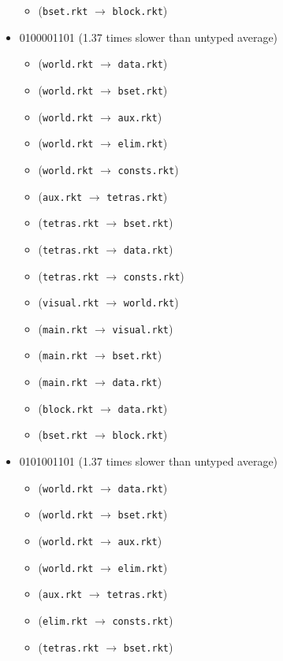 \documentclass{article}
\newcommand{\mono}[1]{\texttt{#1}}
\begin{document}
\begin{itemize}
\begin{itemize}
  \item (\mono{bset.rkt} $\rightarrow$ \mono{block.rkt})
  \end{itemize}
\item 0100001101 (1.37 times slower than untyped average)
  \begin{itemize}
  \item (\mono{world.rkt} $\rightarrow$ \mono{data.rkt})
  \item (\mono{world.rkt} $\rightarrow$ \mono{bset.rkt})
  \item (\mono{world.rkt} $\rightarrow$ \mono{aux.rkt})
  \item (\mono{world.rkt} $\rightarrow$ \mono{elim.rkt})
  \item (\mono{world.rkt} $\rightarrow$ \mono{consts.rkt})
  \item (\mono{aux.rkt} $\rightarrow$ \mono{tetras.rkt})
  \item (\mono{tetras.rkt} $\rightarrow$ \mono{bset.rkt})
  \item (\mono{tetras.rkt} $\rightarrow$ \mono{data.rkt})
  \item (\mono{tetras.rkt} $\rightarrow$ \mono{consts.rkt})
  \item (\mono{visual.rkt} $\rightarrow$ \mono{world.rkt})
  \item (\mono{main.rkt} $\rightarrow$ \mono{visual.rkt})
  \item (\mono{main.rkt} $\rightarrow$ \mono{bset.rkt})
  \item (\mono{main.rkt} $\rightarrow$ \mono{data.rkt})
  \item (\mono{block.rkt} $\rightarrow$ \mono{data.rkt})
  \item (\mono{bset.rkt} $\rightarrow$ \mono{block.rkt})
  \end{itemize}
\item 0101001101 (1.37 times slower than untyped average)
  \begin{itemize}
  \item (\mono{world.rkt} $\rightarrow$ \mono{data.rkt})
  \item (\mono{world.rkt} $\rightarrow$ \mono{bset.rkt})
  \item (\mono{world.rkt} $\rightarrow$ \mono{aux.rkt})
  \item (\mono{world.rkt} $\rightarrow$ \mono{elim.rkt})
  \item (\mono{aux.rkt} $\rightarrow$ \mono{tetras.rkt})
  \item (\mono{elim.rkt} $\rightarrow$ \mono{consts.rkt})
  \item (\mono{tetras.rkt} $\rightarrow$ \mono{bset.rkt})

\end{itemize}
\end{itemize}
\end{document}
